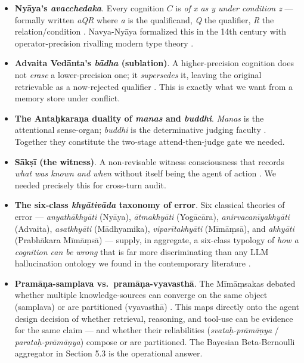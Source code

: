 \begin{itemize}
\item
  \textbf{Nyāya's \emph{avacchedaka}}. Every cognition \(C\) is \emph{of x as y under condition z} --- formally written \emph{aQR} where \emph{a} is the qualificand, \emph{Q} the qualifier, \emph{R} the relation/condition \citep{matilal1986perception, matilal1968navyanyaya, ingalls1951materials, phillips2012epistemology, gangesa14tattvacintamani}. Navya-Nyāya formalized this in the 14th century with operator-precision rivalling modern type theory \citep{ganeri2001philosophy, guha1968navyanyaya, ingalls1951materials}.
\item
  \textbf{Advaita Vedānta's \emph{bādha} (sublation)}. A higher-precision cognition does not \emph{erase} a lower-precision one; it \emph{supersedes} it, leaving the original retrievable as a now-rejected qualifier \citep{deutsch1969advaita, dharmaraja17vedantaparibhasa, shaw1990bada, rambachan2006advaita}. This is exactly what we want from a memory store under conflict.
\item
  \textbf{The Antaḥkaraṇa duality of \emph{manas} and \emph{buddhi}}. \emph{Manas} is the attentional sense-organ; \emph{buddhi} is the determinative judging faculty \citep{deutsch1969advaita, datta1932advaita, ramprasad2013advaita}. Together they constitute the two-stage attend-then-judge gate we needed.
\item
  \textbf{Sākṣī (the witness)}. A non-revisable witness consciousness that records \emph{what was known and when} without itself being the agent of action \citep{ganeri2017concealed, indich1980consciousness, fasching2009witness, sankaraupadesha}. We needed precisely this for cross-turn audit.
\item
  \textbf{The six-class \emph{khyātivāda} taxonomy of error}. Six classical theories of error --- \emph{anyathākhyāti} (Nyāya), \emph{ātmakhyāti} (Yogācāra), \emph{anirvacanīyakhyāti} (Advaita), \emph{asatkhyāti} (Mādhyamika), \emph{viparītakhyāti} (Mīmāṃsā), and \emph{akhyāti} (Prabhākara Mīmāṃsā) --- supply, in aggregate, a six-class typology of \emph{how a cognition can be wrong} that is far more discriminating than any LLM hallucination ontology we found in the contemporary literature \citep{ram2007error, matilal1986perception, bhatt1989prabhakara, datta1932advaita, bilimoria2018epistemology, mohanty1992reason}.
\item
  \textbf{Pramāṇa-samplava vs.~pramāṇa-vyavasthā}. The Mīmāṃsakas debated whether multiple knowledge-sources can converge on the same object (samplava) or are partitioned (vyavasthā) \citep{guha2016svatahpramanya, dasti2008jayanta, dasti2012perception, bhattacharyya1988svatahprama}. This maps directly onto the agent design decision of whether retrieval, reasoning, and tool-use can be evidence for the same claim --- and whether their reliabilities (\emph{svataḥ-prāmāṇya} / \emph{parataḥ-prāmāṇya}) compose or are partitioned. The Bayesian Beta-Bernoulli aggregator in Section 5.3 is the operational answer.

\end{itemize}
